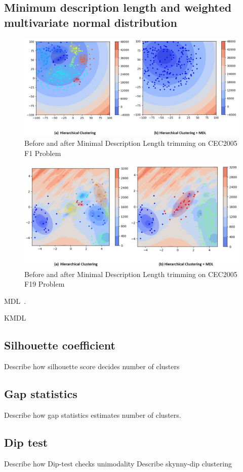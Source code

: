 \subsection{Minimum description length and weighted multivariate normal distribution}

\begin{figure}
\centering
\includegraphics[width=\textwidth]{MDL_comparison}
\caption{Before and after Minimal Description Length trimming on CEC2005 F1 Problem}\label{fig:MDL_comparison}
\end{figure}

\begin{figure}
\centering
\includegraphics[width=\textwidth]{MDL_comparison_F19}
\caption{Before and after Minimal Description Length trimming on CEC2005 F19 Problem}\label{fig:MDL_comparison_F19}
\end{figure}


MDL~\cite{Rissanen:1984:Universal}.

KMDL~\cite{Kyrgyzov:2007:KMDL}

\subsection{Silhouette coefficient}
Describe how silhouette score decides number of clusters 
\subsection{Gap statistics}
Describe how gap statistics estimates number of clusters.
\subsection{Dip test}
Describe how Dip-test checks unimodality
Describe skynny-dip clustering



